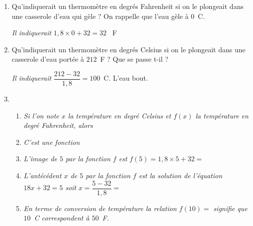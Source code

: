 \documentclass[10pt]{article}
\begin{document}
\begin{enumerate}
\item Qu'indiquerait un thermomètre en degrés Fahrenheit si on le plongeait dans une casserole d'eau qui gèle ? On rappelle que l'eau gèle à 0~\degres C. 

\textit{Il indiquerait} $1,8\times 0+32=32$ \degres~F
\item Qu'indiquerait un thermomètre en degrés Celsius si on le plongeait dans une 
casserole d'eau portée à $212$~\degres F ? Que se passe t-il ?

\textit{Il indiquerait} $\dfrac{212-32}{1,8}=100$\degres~C. L'eau bout.
\item 
	\begin{enumerate}
		\item \textit{Si l'on note $x$ la température en degré Celsius et $f(x)$ la température en degré Fahrenheit, alors} 
		\item \textit{C'est une fonction }
		\item \textit{L'image de $5$ par la fonction $f$ est} $f(5)=1,8\times 5+32=$ 
		\item \textit{L'antécédent $x$ de $5$ par la fonction $f$ est la solution de l'équation $18x+32=5$ soit} $x=\dfrac{5-32}{1,8}=$
		\item \textit{En terme de conversion de température la relation $f(10) =$ signifie que $10$\degres~C correspondent à $50$\degres~F.}
	\end{enumerate} 
\end{enumerate} 
\end{document}

